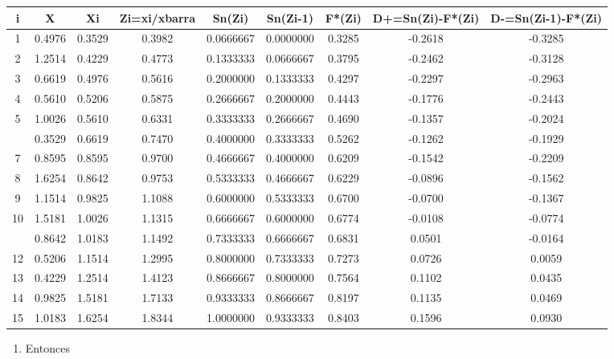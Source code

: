 \documentclass[a4paper,oneside,openany]{book}
\providecommand{\tightlist}{%
  \setlength{\itemsep}{0pt}\setlength{\parskip}{0pt}}
\begin{document}
\begin{table}[H]
\centering
\begin{tabular}{ccccccccc}
\toprule
i & X & Xi & Zi=xi/xbarra & Sn(Zi) & Sn(Zi-1) & F*(Zi) & D+=Sn(Zi)-F*(Zi) & D-=Sn(Zi-1)-F*(Zi)\\
\midrule
1 & 0.4976 & 0.3529 & 0.3982 & 0.0666667 & 0.0000000 & 0.3285 & -0.2618 & -0.3285\\
2 & 1.2514 & 0.4229 & 0.4773 & 0.1333333 & 0.0666667 & 0.3795 & -0.2462 & -0.3128\\
3 & 0.6619 & 0.4976 & 0.5616 & 0.2000000 & 0.1333333 & 0.4297 & -0.2297 & -0.2963\\
4 & 0.5610 & 0.5206 & 0.5875 & 0.2666667 & 0.2000000 & 0.4443 & -0.1776 & -0.2443\\
5 & 1.0026 & 0.5610 & 0.6331 & 0.3333333 & 0.2666667 & 0.4690 & -0.1357 & -0.2024\\
\addlinespace
6 & 0.3529 & 0.6619 & 0.7470 & 0.4000000 & 0.3333333 & 0.5262 & -0.1262 & -0.1929\\
7 & 0.8595 & 0.8595 & 0.9700 & 0.4666667 & 0.4000000 & 0.6209 & -0.1542 & -0.2209\\
8 & 1.6254 & 0.8642 & 0.9753 & 0.5333333 & 0.4666667 & 0.6229 & -0.0896 & -0.1562\\
9 & 1.1514 & 0.9825 & 1.1088 & 0.6000000 & 0.5333333 & 0.6700 & -0.0700 & -0.1367\\
10 & 1.5181 & 1.0026 & 1.1315 & 0.6666667 & 0.6000000 & 0.6774 & -0.0108 & -0.0774\\
\addlinespace
11 & 0.8642 & 1.0183 & 1.1492 & 0.7333333 & 0.6666667 & 0.6831 & 0.0501 & -0.0164\\
12 & 0.5206 & 1.1514 & 1.2995 & 0.8000000 & 0.7333333 & 0.7273 & 0.0726 & 0.0059\\
13 & 0.4229 & 1.2514 & 1.4123 & 0.8666667 & 0.8000000 & 0.7564 & 0.1102 & 0.0435\\
14 & 0.9825 & 1.5181 & 1.7133 & 0.9333333 & 0.8666667 & 0.8197 & 0.1135 & 0.0469\\
15 & 1.0183 & 1.6254 & 1.8344 & 1.0000000 & 0.9333333 & 0.8403 & 0.1596 & 0.0930\\
\bottomrule
\end{tabular}
\end{table}

\begin{enumerate}
\def\labelenumi{\arabic{enumi})}
\setcounter{enumi}{8}
\tightlist
\item
  Entonces
\end{enumerate}
\end{document}
